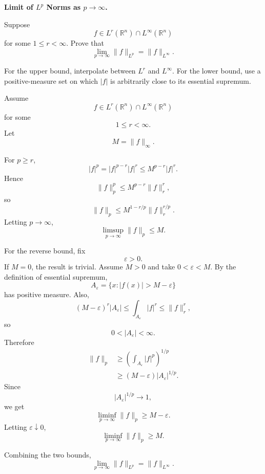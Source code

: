\begin{problem}[CP-II-0476]
\label{prob:cp-ii-0476}
\textbf{Limit of \(L^p\) Norms as \(p\to\infty\).}

\hspace*{1.5em}Suppose
\[
f\in L^r(\mathbb R^n)\cap L^\infty(\mathbb R^n)
\]
for some \(1\le r<\infty\). Prove that
\[
\boxed{
\lim_{p\to\infty}\|f\|_{L^p}
=
\|f\|_{L^\infty}.
}
\]

For the upper bound, interpolate between \(L^r\) and \(L^\infty\). For the
lower bound, use a positive-measure set on which \(|f|\) is arbitrarily close
to its essential supremum.
\end{problem}

\begin{solution}
Assume
\[
f\in L^r(\mathbb R^n)\cap L^\infty(\mathbb R^n)
\]
for some
\[
1\le r<\infty.
\]
Let
\[
M=\|f\|_\infty.
\]

For \(p\ge r\),
\[
|f|^p
=
|f|^{p-r}|f|^r
\le
M^{p-r}|f|^r.
\]
Hence
\[
\|f\|_p^p
\le
M^{p-r}\|f\|_r^r,
\]
so
\[
\|f\|_p
\le
M^{1-r/p}
\|f\|_r^{r/p}.
\]
Letting \(p\to\infty\),
\[
\limsup_{p\to\infty}\|f\|_p
\le
M.
\]

For the reverse bound, fix
\[
\varepsilon>0.
\]
If \(M=0\), the result is trivial. Assume \(M>0\) and take \(0<\varepsilon<M\). By the
definition of essential supremum,
\[
A_\varepsilon
=
\{x:|f(x)|>M-\varepsilon\}
\]
has positive measure. Also,
\[
(M-\varepsilon)^r|A_\varepsilon|
\le
\int_{A_\varepsilon}|f|^r
\le
\|f\|_r^r,
\]
so
\[
0<|A_\varepsilon|<\infty.
\]
Therefore
\[
\begin{aligned}
\|f\|_p
&\ge
\left(
\int_{A_\varepsilon}|f|^p
\right)^{1/p}\\
&\ge
(M-\varepsilon)
|A_\varepsilon|^{1/p}.
\end{aligned}
\]
Since
\[
|A_\varepsilon|^{1/p}\to1,
\]
we get
\[
\liminf_{p\to\infty}\|f\|_p
\ge
M-\varepsilon.
\]
Letting \(\varepsilon\downarrow0\),
\[
\liminf_{p\to\infty}\|f\|_p
\ge
M.
\]

Combining the two bounds,
\[
\boxed{
\lim_{p\to\infty}\|f\|_{L^p}
=
\|f\|_{L^\infty}.
}
\]
\end{solution}


